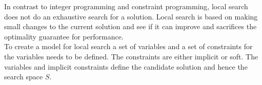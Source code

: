 In contrast to integer programming and constraint programming, local search does not do an exhaustive 
search for a solution. Local search is based on making small changes to the current solution and 
see if it can improve and sacrifices the optimality guarantee for performance. \\ 
To create a model for local search a set of variables and a set of constraints for the variables needs to be defined. 
The constraints are either implicit or soft. The variables and implicit constraints define the 
candidate solution and hence the search space $S$.
